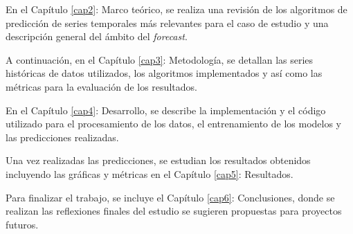 En el Capítulo \ref{cap2}: Marco teórico, se realiza una revisión de los algoritmos de predicción de series temporales más relevantes para el caso de estudio y una descripción general del ámbito del \textit{forecast}.

A continuación, en el Capítulo \ref{cap3}: Metodología, se detallan las series históricas de datos utilizados, los algoritmos implementados y así como las métricas para la evaluación de los resultados.

En el Capítulo \ref{cap4}: Desarrollo, se describe la implementación y el código utilizado para el procesamiento de los datos, el entrenamiento de los modelos y las predicciones realizadas.

Una vez realizadas las predicciones, se estudian los resultados obtenidos incluyendo las gráficas y métricas en el Capítulo \ref{cap5}: Resultados.

Para finalizar el trabajo, se incluye el Capítulo \ref{cap6}: Conclusiones, donde se realizan las reflexiones finales del estudio se sugieren propuestas para proyectos futuros.







